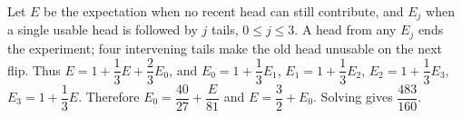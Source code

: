 Let $E$ be the expectation when no recent head can still contribute, and $E_j$ when a single usable head is followed by $j$ tails, $0\le j\le3$. A head from any $E_j$ ends the experiment; four intervening tails make the old head unusable on the next flip. Thus $E=1+\dfrac{1}{3}E+\dfrac{2}{3}E_0$, and $E_0=1+\dfrac{1}{3}E_1$, $E_1=1+\dfrac{1}{3}E_2$, $E_2=1+\dfrac{1}{3}E_3$, $E_3=1+\dfrac{1}{3}E$. Therefore $E_0=\dfrac{40}{27}+\dfrac{E}{81}$ and $E=\dfrac{3}{2}+E_0$. Solving gives $\boxed{\dfrac{483}{160}}$.
